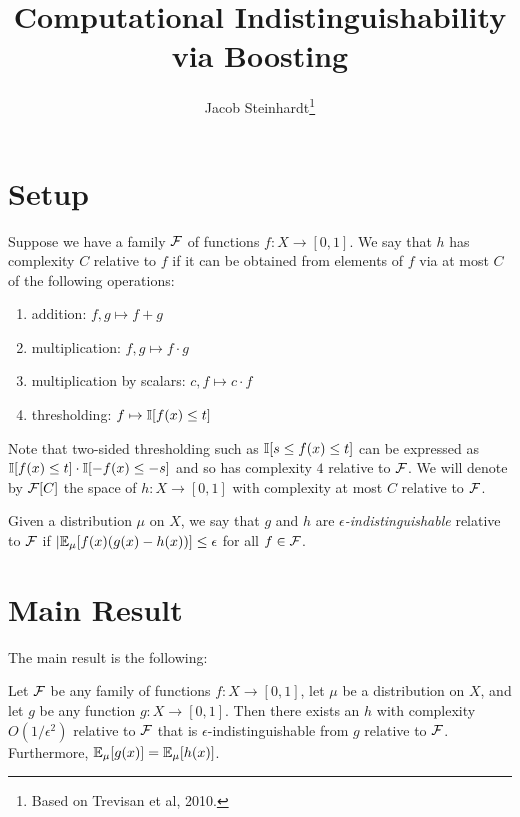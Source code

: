 \documentclass[11pt]{article}
\title{Computational Indistinguishability via Boosting}
\author{Jacob Steinhardt\footnote{Based on Trevisan et al, 2010.}}
\begin{document}
\maketitle

\section{Setup}
Suppose we have a family $\mathcal{F}$ of functions $f : X \to [0,1]$. We 
say that $h$ has complexity $C$ relative to $f$ if it can be obtained 
from elements of $f$ via at most $C$ of the following operations:
\begin{enumerate}
\item addition: $f,g \mapsto f+g$
\item multiplication: $f,g \mapsto f\cdot g$
\item multiplication by scalars: $c,f \mapsto c \cdot f$
\item thresholding: $f \mapsto \mathbb{I}[f(x) \leq t]$
\end{enumerate}
Note that two-sided thresholding such as $\mathbb{I}[s \leq f(x) \leq t]$ can be 
expressed as $\mathbb{I}[f(x) \leq t] \cdot \mathbb{I}[-f(x) \leq -s]$ and so has complexity 
$4$ relative to $\mathcal{F}$. We will denote by $\mathcal{F}[C]$ the space of $h : X \to [0,1]$ 
with complexity at most $C$ relative to $\mathcal{F}$.

Given a distribution $\mu$ on $X$, we say that $g$ and $h$ are 
\emph{$\epsilon$-indistinguishable} relative to $\mathcal{F}$ if 
$|\mathbb{E}_{\mu}[f(x)(g(x)-h(x))] \leq \epsilon$ for all $f \in \mathcal{F}$. 

\section{Main Result}
The main result is the following:

\begin{theorem}
\label{thm:luca}
Let $\mathcal{F}$ be any family of functions $f : X \to [0,1]$, let $\mu$ be a 
distribution on $X$, and let $g$ be any function $g : X \to [0,1]$. Then 
there exists an $h$ with complexity $O(1/\epsilon^2)$ relative to $\mathcal{F}$ that is 
$\epsilon$-indistinguishable from $g$ relative to $\mathcal{F}$. Furthermore, $\mathbb{E}_{\mu}[g(x)] = \mathbb{E}_{\mu}[h(x)]$.
\end{theorem}
\end{document}
